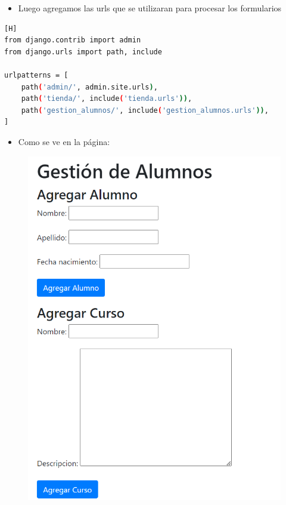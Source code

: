 \documentclass{article}
\begin{document}
	\begin{itemize}
		\item Luego agregamos las urls que se utilizaran para procesar los formularios
	\end{itemize} 
	
	\begin{lstlisting}[language=bash,caption={Código de urls.py del proyecto}][H]
from django.contrib import admin
from django.urls import path, include

urlpatterns = [
    path('admin/', admin.site.urls),
    path('tienda/', include('tienda.urls')),
    path('gestion_alumnos/', include('gestion_alumnos.urls')),
]
	\end{lstlisting}
	
	\begin{itemize}
		\item Como se ve en la página:
	\end{itemize} 
	\begin{figure}[H]
		\centering
		\includegraphics[width=1.0\textwidth,keepaspectratio]{img/Vista1.png}
	\end{figure}
\end{document}
